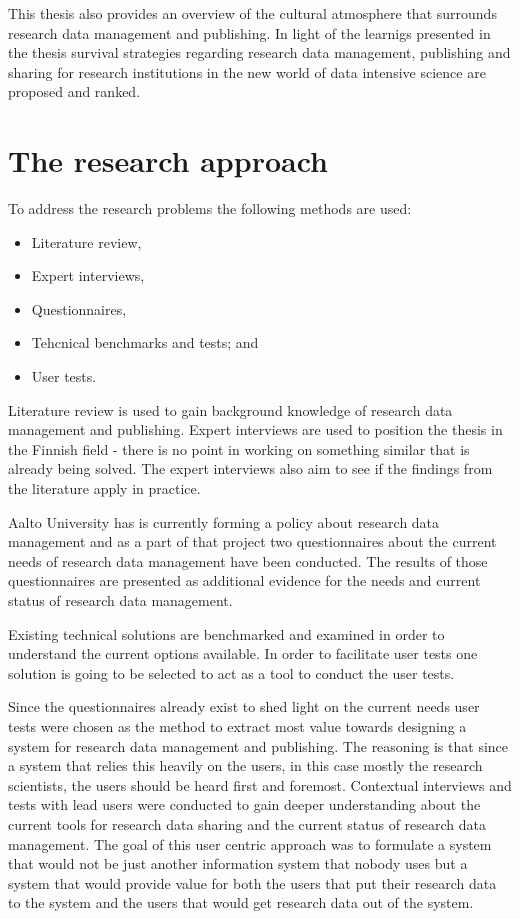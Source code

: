 This thesis also provides an overview of the cultural atmosphere that surrounds
research data management and publishing. In light of the learnigs presented in
the thesis survival strategies regarding research data management, publishing and
sharing for research institutions in the new world of
data intensive science are proposed and ranked.

\section{The research approach}

To address the research problems the following methods are used:

\begin{itemize}
    \item Literature review,
    \item Expert interviews,
    \item Questionnaires,
    \item Tehcnical benchmarks and tests; and
    \item User tests.
\end{itemize}

Literature review is used to gain background knowledge of research data
management and publishing. Expert interviews are used to position the thesis
in the Finnish field - there is no point in working on something similar that
is already being solved. The expert interviews also aim to see if the findings
from the literature apply in practice.

Aalto University has is currently forming a policy about research data
management and as a part of that project two questionnaires about the
current needs of research data management have been conducted. The results of
those questionnaires are presented as additional evidence for the needs and
current status of research data management.

Existing technical solutions are benchmarked and examined in order to
understand the current options available. In order to facilitate user tests
one solution is going to be selected to act as a tool to conduct the user
tests.

Since the questionnaires already exist to shed light on the current needs user
tests were chosen as the method to extract most value towards designing a
system for research data management and publishing. The reasoning is that since
a system that relies this heavily on the users, in this case mostly the
research scientists, the users should be heard first and foremost. Contextual
interviews and tests with lead users were conducted to gain deeper
understanding about the current tools for research data sharing and the current
status of research data management. The goal of this user centric approach was
to formulate a system that would not be just another information system that
nobody uses but a system that would provide value for both the users that
put their research data to the system and the users that would get research
data out of the system.

